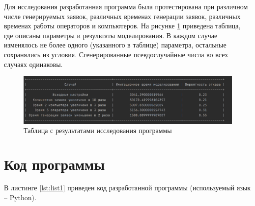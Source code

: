 \documentclass[14pt, a4paper]{extarticle}
\begin{document}
Для исследования разработанная программа была протестирована при различном числе генерируемых заявок, различных временах генерации заявок, различных временах работы операторов и компьютеров. На рисунке \ref{pic:res} приведена таблица, где описаны параметры и результаты моделирования. В каждом случае изменялось не более одного (указанного в таблице) параметра, остальные сохранялись из условия. Сгенерированные псевдослучайные числа во всех случаях одинаковы. 

\begin{figure}[h]
	\begin{center}
		{\includegraphics[scale=0.75]{pictures/res.png}
			\caption{Таблица с результатами исследования программы}
			\label{pic:res}}
	\end{center}
\end{figure}



\section{Код программы}

В листинге \ref{lst:list1} приведен код разработанной программы (используемый язык -- Python). 
\end{document}
